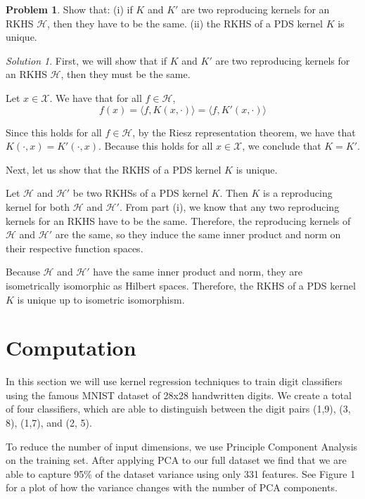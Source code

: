 \documentclass[12pt,a4paper]{article}
\theoremstyle{definition}
\newtheorem{problem}{Problem}
\theoremstyle{remark}
\newtheorem*{solution}{Solution}
\begin{document}
\begin{problem}
    Show that: (i) if $K$ and $K'$ are two reproducing kernels for an RKHS $\mathcal H$, then they have to be the same. (ii) the RKHS of a PDS kernel $K$ is unique.
\end{problem}
\begin{solution}
    First, we will show that if $K$ and $K'$ are two reproducing kernels for an RKHS $\mathcal H$, then they must be the same. 

    Let $x \in \mathcal X$. We have that for all $f \in \mathcal H$, $$f(x) = \langle f, K(x, \cdot) \rangle = \langle f, K'(x, \cdot) \rangle$$

    Since this holds for all $f \in \mathcal H$, by the Riesz representation theorem, we have that $K(\cdot, x) = K'(\cdot, x)$. Because this holds for all $x \in \mathcal X$, we conclude that $K = K'$.

    Next, let us show that the RKHS of a PDS kernel $K$ is unique. 

    Let $\mathcal H$ and $\mathcal H'$ be two RKHSs of a PDS kernel $K$. Then $K$ is a reproducing kernel for both $\mathcal H$ and $\mathcal H'$. From part (i), we know that any two reproducing kernels for an RKHS have to be the same. Therefore, the reproducing kernels of $\mathcal H$ and $\mathcal H'$ are the same, so they induce the same inner product and norm on their respective function spaces.

    Because $\mathcal H$ and $\mathcal H'$ have the same inner product and norm, they are isometrically isomorphic as Hilbert spaces. Therefore, the RKHS of a PDS kernel $K$ is unique up to isometric isomorphism.
\end{solution}

\section{Computation}

In this section we will use kernel regression techniques to train digit classifiers using the famous MNIST dataset of 28x28 handwritten digits. We create a total of four classifiers, which are able to distinguish between the digit pairs (1,9), (3, 8), (1,7), and (2, 5). 

To reduce the number of input dimensions, we use Principle Component Analysis on the training set. After applying PCA to our full dataset we find that we are able to capture 95\% of the dataset variance using only 331 features. See Figure 1 for a plot of how the variance changes with the number of PCA components.
\end{document}
